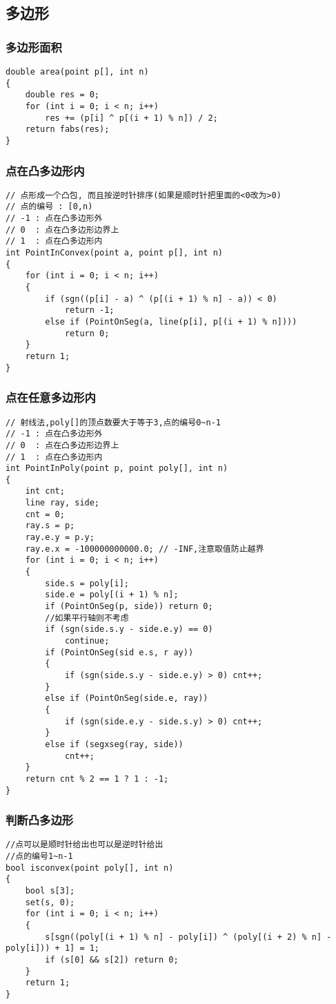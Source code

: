 \documentclass[a4]{article}
\begin{document}
\subsection{多边形}
\subsubsection{多边形面积}
\begin{lstlisting}
double area(point p[], int n)
{
    double res = 0;
    for (int i = 0; i < n; i++)
        res += (p[i] ^ p[(i + 1) % n]) / 2;
    return fabs(res);
}
\end{lstlisting}
\subsubsection{点在凸多边形内}
\begin{lstlisting}
// 点形成一个凸包, 而且按逆时针排序(如果是顺时针把里面的<0改为>0)
// 点的编号 : [0,n)
// -1 : 点在凸多边形外
// 0  : 点在凸多边形边界上
// 1  : 点在凸多边形内
int PointInConvex(point a, point p[], int n)
{
    for (int i = 0; i < n; i++)
    {
        if (sgn((p[i] - a) ^ (p[(i + 1) % n] - a)) < 0)
            return -1;
        else if (PointOnSeg(a, line(p[i], p[(i + 1) % n])))
            return 0;
    }
    return 1;
}
\end{lstlisting}
\subsubsection{点在任意多边形内}
\begin{lstlisting}
// 射线法,poly[]的顶点数要大于等于3,点的编号0~n-1
// -1 : 点在凸多边形外
// 0  : 点在凸多边形边界上
// 1  : 点在凸多边形内
int PointInPoly(point p, point poly[], int n)
{
    int cnt;
    line ray, side;
    cnt = 0;
    ray.s = p;
    ray.e.y = p.y;
    ray.e.x = -100000000000.0; // -INF,注意取值防止越界
    for (int i = 0; i < n; i++)
    {
        side.s = poly[i];
        side.e = poly[(i + 1) % n];
        if (PointOnSeg(p, side)) return 0;
        //如果平行轴则不考虑
        if (sgn(side.s.y - side.e.y) == 0)
            continue;
        if (PointOnSeg(sid e.s, r ay))
        {
            if (sgn(side.s.y - side.e.y) > 0) cnt++;
        }
        else if (PointOnSeg(side.e, ray))
        {
            if (sgn(side.e.y - side.s.y) > 0) cnt++;
        }
        else if (segxseg(ray, side))
            cnt++;
    }
    return cnt % 2 == 1 ? 1 : -1;
}
\end{lstlisting}
\subsubsection{判断凸多边形}
\begin{lstlisting}
//点可以是顺时针给出也可以是逆时针给出
//点的编号1~n-1
bool isconvex(point poly[], int n)
{
    bool s[3];
    set(s, 0);
    for (int i = 0; i < n; i++)
    {
        s[sgn((poly[(i + 1) % n] - poly[i]) ^ (poly[(i + 2) % n] - poly[i])) + 1] = 1;
        if (s[0] && s[2]) return 0;
    }
    return 1;
}
\end{lstlisting}
\end{document}
